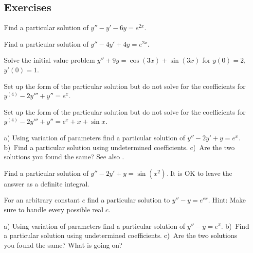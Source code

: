 \subsection{Exercises}

\begin{exercise}
Find a particular solution of
$y''-y' -6y = e^{2x}$.
\end{exercise}

\begin{exercise}
Find a particular solution of
$y''-4y' +4y = e^{2x}$.
\end{exercise}

\begin{exercise}
Solve the initial value problem
$y''+9y = \cos (3x) + \sin (3x)$ for $y(0) = 2$, $y'(0) = 1$.
\end{exercise}

\begin{exercise}
Set up the form of the particular solution but do not solve
for the coefficients for $y^{(4)}-2y'''+y'' = e^x$.
\end{exercise}

\begin{exercise}
Set up the form of the particular solution but do not solve
for the coefficients for $y^{(4)}-2y'''+y'' = e^x + x + \sin x$.
\end{exercise}

\begin{exercise}
a) Using variation of parameters find a particular solution of
$y''-2y'+y = e^x$.  b)~Find a particular solution using undetermined
coefficients.  c)~Are the two solutions you found the same?
See also .
\end{exercise}

\begin{exercise}
Find a particular solution of
$y''-2y' +y = \sin (x^2)$.  It is OK to leave the answer as a definite
integral.
\end{exercise}

\begin{exercise}
For an arbitrary constant $c$ find a particular solution
to $y''-y=e^{cx}$.  Hint: Make sure to handle every possible real $c$.
\end{exercise}

\begin{exercise} \label{exercise:diffvarparunder}
a) Using variation of parameters find a particular solution of
$y''-y = e^x$.  b)~Find a particular solution using undetermined
coefficients.  c)~Are the two solutions you found the same?
What is going on?
\end{exercise}

